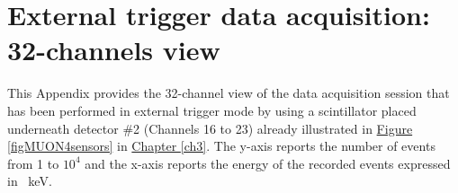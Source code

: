 \chapter[External trigger data acquisition: 32-channels view]{External trigger data acquisition: 32-channels view} \label{appendix32CHmuons}

This Appendix provides the 32-channel view of the data acquisition session that has been performed in external trigger mode by using a scintillator placed underneath detector \#2 (Channels 16 to 23) already illustrated in \hyperref[figMUON4sensors]{Figure \ref{figMUON4sensors}} in \hyperref[ch3]{Chapter \ref{ch3}}. The y-axis reports the number of events from 1 to $10^{4}$ and the x-axis reports the energy of the recorded events expressed in \SI{}{\kilo\electronvolt}.

